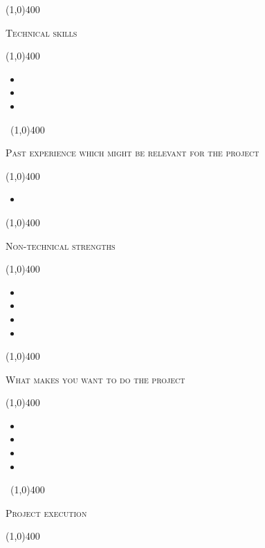 \documentclass[12pt,a4paper]{report}
\begin{document}
	\begin{center}
	
	\line(1,0){400}\\
	{\scshape\large Technical skills\par}
	\line(1,0){400}\\
	\end{center}
		\begin{itemize}
\item 
\item 
\item  
\end{itemize}
\newpage
\begin{center}
	\vspace*{-3cm}\
	\line(1,0){400}\\
	{\scshape\large Past experience which might be relevant for the project\par}
	\line(1,0){400}\\
	\end{center}
		\begin{itemize}
\item 

\end{itemize}

	\begin{center}
	
	\line(1,0){400}\\
	{\scshape\large Non-technical strengths\par}
	\line(1,0){400}\\
	\end{center}
		\begin{itemize}
\item 
\item 
\item 
\item 
\end{itemize}

\begin{center}
	
	\line(1,0){400}\\
	{\scshape\large What makes you want to do the project\par}
	\line(1,0){400}\\
	\end{center}
		\begin{itemize}
\item 
\item 
\item 
\item 
\end{itemize}
\newpage
	\begin{center}
	\vspace*{-3cm}\
	\line(1,0){400}\\
	{\scshape\Large Project execution\par}
	\line(1,0){400}\\
	\end{center}
	
\end{document}
